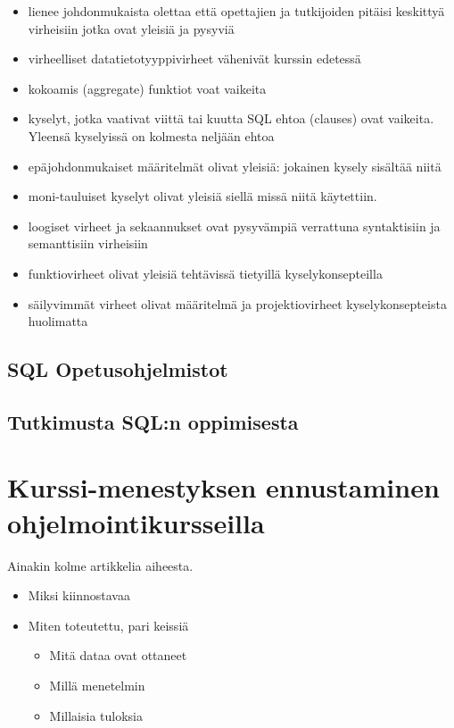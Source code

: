 \documentclass[finnish,twoside,openright]{HYgraduMLDS}
\begin{document}
\begin{itemize}
\begin{itemize}
    \end{itemize}
    \item lienee johdonmukaista olettaa että opettajien ja tutkijoiden pitäisi keskittyä virheisiin jotka ovat yleisiä ja pysyviä
    \item virheelliset datatietotyyppivirheet vähenivät kurssin edetessä
    \item kokoamis (aggregate) funktiot voat vaikeita
    \item kyselyt, jotka vaativat viittä tai kuutta SQL ehtoa (clauses) ovat vaikeita. Yleensä kyselyissä on kolmesta neljään ehtoa
    \item epäjohdonmukaiset määritelmät olivat yleisiä: jokainen kysely sisältää niitä
    \item moni-tauluiset kyselyt olivat yleisiä siellä missä niitä käytettiin.
    \item loogiset virheet ja sekaannukset ovat pysyvämpiä verrattuna syntaktisiin ja semanttisiin virheisiin
    \item funktiovirheet olivat yleisiä tehtävissä tietyillä kyselykonsepteilla
    \item säilyvimmät virheet olivat määritelmä ja projektiovirheet kyselykonsepteista huolimatta
\end{itemize}

\subsection{SQL Opetusohjelmistot}


\subsection{Tutkimusta SQL:n oppimisesta}


\section{Kurssi-menestyksen ennustaminen ohjelmointikursseilla}

Ainakin kolme artikkelia aiheesta.

\begin{itemize}
    \item Miksi kiinnostavaa
    \item Miten toteutettu, pari keissiä
    \begin{itemize}
        \item Mitä dataa ovat ottaneet
        \item Millä menetelmin
        \item Millaisia tuloksia
    \end{itemize}
\end{itemize}
\end{document}
